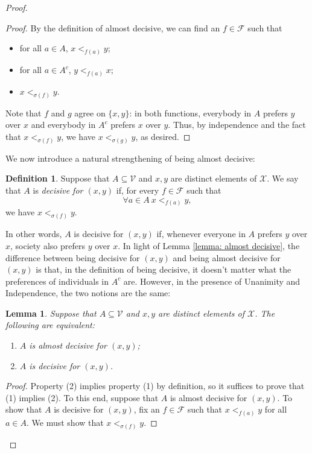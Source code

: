 \documentclass[a4paper]{memoir}
\newtheorem{lemma}[theorem]{Lemma}
\theoremstyle{definition}
\newtheorem{definition}[theorem]{Definition}
\newcommand{\mc}{\mathcal}
\begin{document}
\begin{proof}
\begin{proof}
    By the definition of almost decisive, we can find an $f \in \mc{F}$ such that
    \begin{itemize}
      \item for all $a \in A$, $x <_{f(a)} y$;
      \item for all $a \in A^c$, $y <_{f(a)} x$;
      \item $x <_{\sigma(f)} y$.
    \end{itemize}
    Note that $f$ and $g$ agree on $\{x,y\}$: in both functions, everybody in $A$ prefers 
    $y$ over $x$ and everybody in $A^c$ prefers $x$ over $y$. Thus, by independence and 
    the fact that $x <_{\sigma(f)} y$, we have $x <_{\sigma(g)} y$, as desired.
  \end{proof}
  
  We now introduce a natural strengthening of being almost decisive:
  
  \begin{definition}
    Suppose that $A \subseteq \mc{V}$ and $x,y$ are distinct elements of $\mc{X}$. We say 
    that $A$ is \emph{decisive for $(x,y)$} if, for every $f \in \mc{F}$ such that 
    \[
      \forall a \in A \ x <_{f(a)} y,
    \]
    we have $x <_{\sigma(f)} y$.
  \end{definition}  
  
  In other words, $A$ is decisive for $(x,y)$ if, whenever everyone in $A$ prefers 
  $y$ over $x$, society also prefers $y$ over $x$. In light of Lemma \ref{lemma: almost decisive}, 
  the difference between being decisive for $(x,y)$ and being almost decisive for $(x,y)$ is 
  that, in the definition of being decisive, it doesn't matter what the preferences of 
  individuals in $A^c$ are. However, in the presence of Unanimity and Independence, the two notions 
  are the same:
  
  \begin{lemma}
    Suppose that $A \subseteq \mc{V}$ and $x,y$ are distinct elements of $\mc{X}$. The 
    following are equivalent:
    \begin{enumerate}
      \item $A$ is almost decisive for $(x,y)$;
      \item $A$ is decisive for $(x,y)$.
    \end{enumerate}
  \end{lemma}
  
  \begin{proof}
     Property (2) implies property (1) by definition, so it suffices to prove that (1) implies (2). 
     To this end, suppose that $A$ is almost decisive for $(x,y)$. To show that $A$ is decisive 
     for $(x,y)$, fix an $f \in \mc{F}$ such that $x <_{f(a)} y$ for all $a \in A$. We must show 
     that $x <_{\sigma(f)} y$.
     

\end{proof}
\end{proof}
\end{document}
